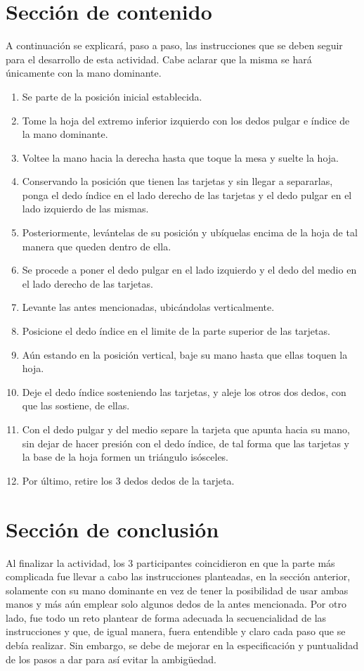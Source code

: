 \documentclass{article}
\begin{document}
\section{Sección de contenido} \label{contenido}
A continuación se explicará, paso a paso, las instrucciones que se deben seguir para el desarrollo de esta actividad. Cabe aclarar que la misma se hará únicamente con la mano dominante.
\begin{enumerate}
    \item Se parte de la posición inicial establecida.
    \item Tome la hoja del extremo inferior izquierdo con los dedos pulgar e índice de la mano dominante. 
    \item Voltee la mano hacia la derecha hasta que toque la mesa y suelte la hoja.
    \item Conservando la posición que tienen las tarjetas y sin llegar a separarlas, ponga el dedo índice en el lado derecho de las tarjetas y el dedo pulgar en el lado izquierdo de las mismas.
    \item Posteriormente, levántelas de su posición y ubíquelas  encima de la hoja de tal manera que queden dentro de ella.
    \item Se procede a poner el dedo pulgar en el lado izquierdo y el dedo del medio en el lado derecho de las tarjetas. 
    \item Levante las antes mencionadas, ubicándolas verticalmente. 
    \item Posicione el dedo índice en el limite de la parte superior de las tarjetas. 
    \item Aún estando en la posición vertical, baje su mano hasta que ellas toquen la hoja.
    \item Deje el dedo índice sosteniendo las tarjetas, y aleje los otros dos dedos, con que las sostiene, de ellas. 
    \item Con el dedo pulgar y del medio separe la tarjeta que apunta hacia su mano, sin dejar de hacer presión con el dedo índice, de tal forma que las tarjetas y la base de la hoja formen un triángulo isósceles.
    \item Por último, retire los 3 dedos dedos de la tarjeta.
\end{enumerate}

\section{Sección de conclusión} \label{contenido}
Al finalizar la actividad, los 3 participantes coincidieron en que la parte más complicada fue llevar a cabo las instrucciones planteadas, en la sección anterior, solamente con su mano dominante en vez de tener la posibilidad de usar ambas manos y más aún emplear solo algunos dedos de la antes mencionada.
Por otro lado, fue todo un reto plantear de forma adecuada la secuencialidad de las instrucciones y que, de igual manera, fuera entendible y claro cada paso que se debía realizar. Sin embargo, se debe de mejorar en la especificación y puntualidad de los pasos a dar para así evitar la ambigüedad.
\end{document}
